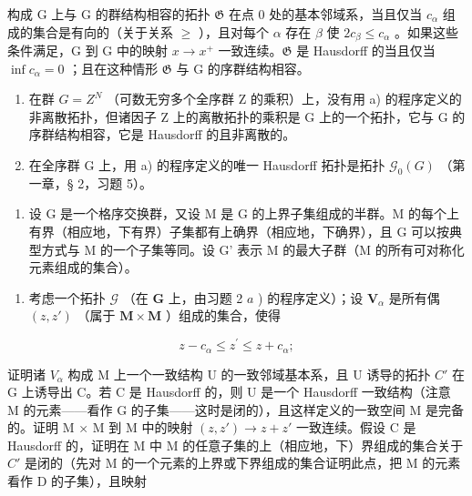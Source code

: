 构成 G 上与 G 的群结构相容的拓扑 \(\mathfrak{G}\) 在点 0 处的基本邻域系，当且仅当 \(c_{\alpha}\) 组成的集合是有向的（关于关系 \(\geqslant\) ），且对每个 \(\alpha\) 存在 \(\beta\) 使 \(2c_{\beta} \leqslant c_{\alpha}\) 。如果这些条件满足，G 到 G 中的映射 \(x \to x^{+}\) 一致连续。\(\mathfrak{G}\) 是 Hausdorff 的当且仅当 \(\inf c_{\alpha} = 0\) ；且在这种情形 \(\mathfrak{G}\) 与 G 的序群结构相容。

\begin{enumerate}
\def\labelenumi{\alph{enumi})}
\setcounter{enumi}{1}
\item
  在群 \(G = Z^{N}\) （可数无穷多个全序群 Z 的乘积）上，没有用 a) 的程序定义的非离散拓扑，但诸因子 Z 上的离散拓扑的乘积是 G 上的一个拓扑，它与 G 的序群结构相容，它是 Hausdorff 的且非离散的。
\item
  在全序群 G 上，用 a) 的程序定义的唯一 Hausdorff 拓扑是拓扑 \(\mathcal{G}_{0}(G)\) （第一章，§ 2，习题 5）。
\end{enumerate}

\begin{enumerate}
\def\labelenumi{\arabic{enumi})}
\setcounter{enumi}{2}
\tightlist
\item
  设 G 是一个格序交换群，又设 M 是 G 的上界子集组成的半群。M 的每个上有界（相应地，下有界）子集都有上确界（相应地，下确界），且 G 可以按典型方式与 M 的一个子集等同。设 G' 表示 M 的最大子群（M 的所有可对称化元素组成的集合）。
\end{enumerate}

\begin{enumerate}
\def\labelenumi{\alph{enumi})}
\tightlist
\item
  考虑一个拓扑 \(\mathcal{G}\) （在 \(\mathbf{G}\) 上，由习题 2 \(a\) ) 的程序定义）；设 \(\mathbf{V}_{\alpha}\) 是所有偶 \((z, z')\) （属于 \(\mathbf{M} \times \mathbf{M}\) ）组成的集合，使得
\end{enumerate}

\[
z - c _ {\alpha} \leqslant z ^ {\prime} \leqslant z + c _ {\alpha};
\]

证明诸 \(V_{\alpha}\) 构成 M 上一个一致结构 U 的一致邻域基本系，且 U 诱导的拓扑 \(C'\) 在 G 上诱导出 C。若 C 是 Hausdorff 的，则 U 是一个 Hausdorff 一致结构（注意 M 的元素——看作 G 的子集——这时是闭的），且这样定义的一致空间 M 是完备的。证明 M × M 到 M 中的映射 \((z, z') \to z + z'\) 一致连续。假设 C 是 Hausdorff 的，证明在 M 中 M 的任意子集的上（相应地，下）界组成的集合关于 \(C'\) 是闭的（先对 M 的一个元素的上界或下界组成的集合证明此点，把 M 的元素看作 D 的子集），且映射

